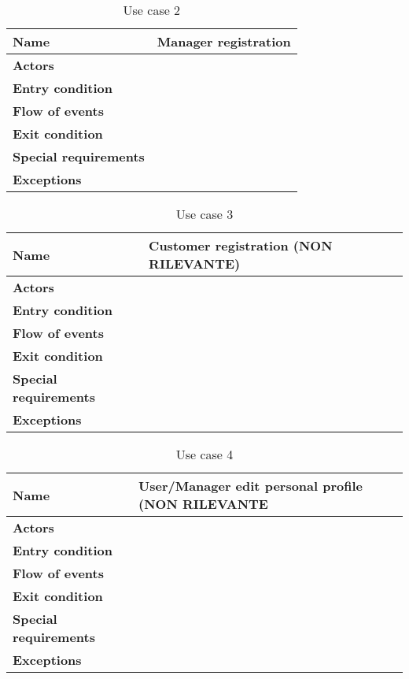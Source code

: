 \begin{table}[h!]
    \centering
    \begin{tabular}{@{}P{0.2\textwidth}P{0.70\textwidth}@{}}
        \toprule
        \textbf{Name}                 & Manager registration\\
        \midrule
        \textbf{Actors}               & \\
        \textbf{Entry condition}      & \\
        \textbf{Flow of events}       & \\
        \textbf{Exit condition}       & \\
        \textbf{Special requirements} & \\
        \textbf{Exceptions}           & \\
        \bottomrule
    \end{tabular}
\caption{Use case 2}
\label{table:usecase2}
\end{table}

\begin{table}[h!]
    \centering
    \begin{tabular}{@{}P{0.2\textwidth}P{0.70\textwidth}@{}}
        \toprule
        \textbf{Name}                 & Customer registration (NON RILEVANTE)\\
        \midrule
        \textbf{Actors}               & \\
        \textbf{Entry condition}      & \\
        \textbf{Flow of events}       & \\
        \textbf{Exit condition}       & \\
        \textbf{Special requirements} & \\
        \textbf{Exceptions}           & \\
        \bottomrule
    \end{tabular}
\caption{Use case 3}
\label{table:usecase3}
\end{table}

\begin{table}[h!]
    \centering
    \begin{tabular}{@{}P{0.2\textwidth}P{0.70\textwidth}@{}}
        \toprule
        \textbf{Name}                 & User/Manager edit personal profile (NON RILEVANTE\\
        \midrule
        \textbf{Actors}               & \\
        \textbf{Entry condition}      & \\
        \textbf{Flow of events}       & \\
        \textbf{Exit condition}       & \\
        \textbf{Special requirements} & \\
        \textbf{Exceptions}           & \\
        \bottomrule
    \end{tabular}
\caption{Use case 4}
\label{table:usecase4}
\end{table}

